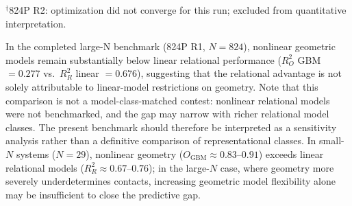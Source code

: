 \documentclass[11pt,a4paper]{article}
\begin{document}
$^\dagger$824P R2: optimization did not converge for this run; excluded from quantitative interpretation.

In the completed large-N benchmark (824P R1, $N=824$), nonlinear geometric models remain substantially below linear relational performance ($R^2_O$ GBM $= 0.277$ vs.\ $R^2_R$ linear $= 0.676$), suggesting that the relational advantage is not solely attributable to linear-model restrictions on geometry.
Note that this comparison is not a model-class-matched contest: nonlinear relational models were not benchmarked, and the gap may narrow with richer relational model classes.
The present benchmark should therefore be interpreted as a sensitivity analysis rather than a definitive comparison of representational classes.
In small-$N$ systems ($N=29$), nonlinear geometry ($O_\text{GBM} \approx 0.83$--$0.91$) exceeds linear relational models ($R^2_R \approx 0.67$--$0.76$); in the large-$N$ case, where geometry more severely underdetermines contacts, increasing geometric model flexibility alone may be insufficient to close the predictive gap.

\end{document}
